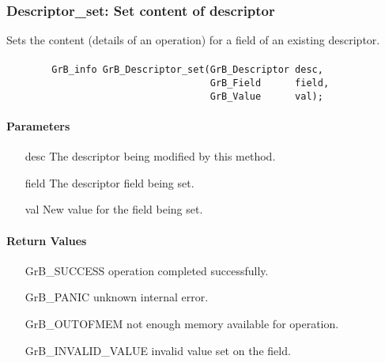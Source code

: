\subsubsection{{\sf Descriptor\_set}: Set content of descriptor}

Sets the content (details of an operation) for a field of an existing
descriptor.

\paragraph{\syntax}

\begin{verbatim}
        GrB_info GrB_Descriptor_set(GrB_Descriptor desc,
                                    GrB_Field      field,
                                    GrB_Value      val);
\end{verbatim}


\paragraph{Parameters}

\begin{itemize}[leftmargin=1.1in]
    \item[{\sf desc}]  The descriptor being modified by this method.
    \item[{\sf field}] The descriptor field being set.
    \item[{\sf val}]   New value for the field being set.
\end{itemize}

\paragraph{Return Values}

\begin{itemize}[leftmargin=2.1in]
\item[{\sf GrB\_SUCCESS}]           operation completed successfully.
\item[{\sf GrB\_PANIC}]             unknown internal error.
\item[{\sf GrB\_OUTOFMEM}]          not enough memory available for operation.
\item[{\sf GrB\_INVALID\_VALUE}]    invalid value set on the field.
\end{itemize}

